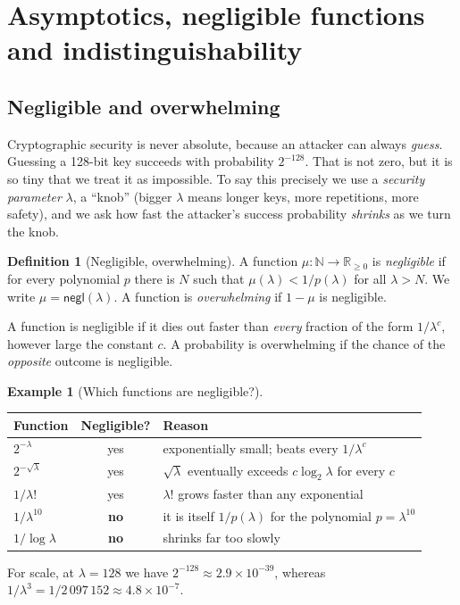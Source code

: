 \documentclass[11pt,a4paper]{report}
\theoremstyle{plain}
\theoremstyle{definition}
\newtheorem{definition}[theorem]{Definition}
\newtheorem{example}[theorem]{Example}
\theoremstyle{remark}
\newcommand{\NN}{\mathbb{N}}\newcommand{\ZZ}{\mathbb{Z}}\newcommand{\FF}{\mathbb{F}}
\newcommand{\negl}{\mathsf{negl}}
\begin{document}
\section{Asymptotics, negligible functions and indistinguishability}
\subsection{Negligible and overwhelming}
Cryptographic security is never absolute, because an attacker can always \emph{guess}. Guessing a 128-bit key succeeds with probability $2^{-128}$. That is not zero, but it is so tiny that we treat it as impossible. To say this precisely we use a \emph{security parameter} $\lambda$, a ``knob'' (bigger $\lambda$ means longer keys, more repetitions, more safety), and we ask how fast the attacker's success probability \emph{shrinks} as we turn the knob.

\begin{definition}[Negligible, overwhelming]
A function $\mu:\NN\to\mathbb{R}_{\ge0}$ is \emph{negligible} if for every polynomial $p$ there is $N$ such that $\mu(\lambda)<1/p(\lambda)$ for all $\lambda>N$. We write $\mu=\negl(\lambda)$. A function is \emph{overwhelming} if $1-\mu$ is negligible.
\end{definition}
\begin{plain}\PE
A function is negligible if it dies out faster than \emph{every} fraction of the form $1/\lambda^c$, however large the constant $c$. A probability is overwhelming if the chance of the \emph{opposite} outcome is negligible.
\end{plain}

\begin{example}[Which functions are negligible?]\label{ex:negl}
\begin{center}
\renewcommand{\arraystretch}{1.2}
\begin{tabular}{@{}l c L{8.2cm}@{}}
\toprule
\textbf{Function} & \textbf{Negligible?} & \textbf{Reason}\\
\midrule
$2^{-\lambda}$ & yes & exponentially small; beats every $1/\lambda^c$\\
$2^{-\sqrt\lambda}$ & yes & $\sqrt\lambda$ eventually exceeds $c\log_2\lambda$ for every $c$\\
$1/\lambda!$ & yes & $\lambda!$ grows faster than any exponential\\
$1/\lambda^{10}$ & \textbf{no} & it is itself $1/p(\lambda)$ for the polynomial $p=\lambda^{10}$\\
$1/\log\lambda$ & \textbf{no} & shrinks far too slowly\\
\bottomrule
\end{tabular}
\end{center}
For scale, at $\lambda=128$ we have $2^{-128}\approx2.9\times10^{-39}$, whereas $1/\lambda^3=1/2\,097\,152\approx4.8\times10^{-7}$.
\end{example}
\end{document}
